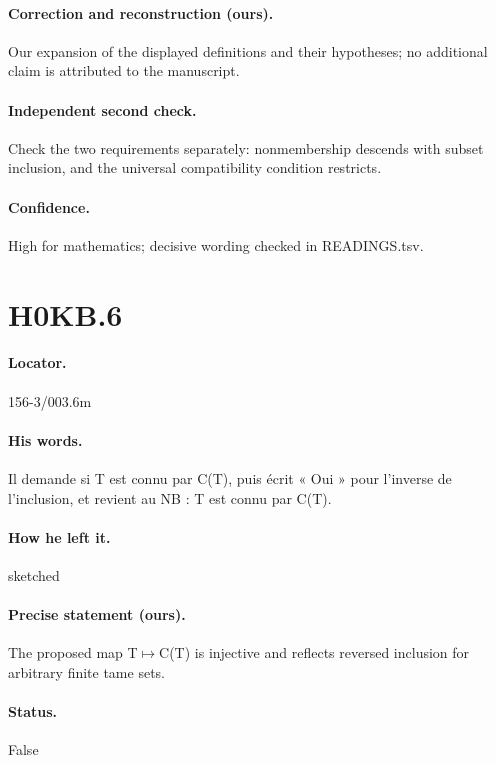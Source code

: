 \paragraph{Correction and reconstruction (ours).} Our expansion of the displayed definitions and their hypotheses; no additional claim is attributed to the manuscript.

\paragraph{Independent second check.} Check the two requirements separately: nonmembership descends with subset inclusion, and the universal compatibility condition restricts.

\paragraph{Confidence.} High for mathematics; decisive wording checked in READINGS.tsv.

\section*{H0KB.6}\label{statement:H0KB.6}
\paragraph{Locator.} 156-3/003.6m

\paragraph{His words.} Il demande si T est connu par C(T), puis écrit « Oui » pour l’inverse de l’inclusion, et revient au NB : T est connu par C(T).

\paragraph{How he left it.} sketched

\paragraph{Precise statement (ours).} The proposed map T\ensuremath{\mapsto}C(T) is injective and reflects reversed inclusion for arbitrary finite tame sets.

\paragraph{Status.} False

